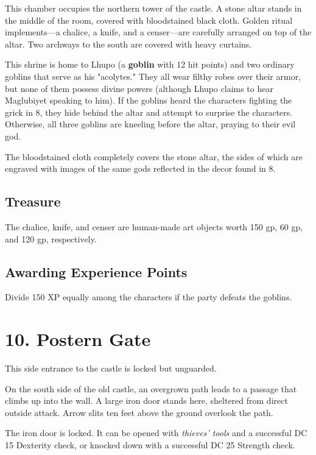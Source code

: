\documentclass[10pt,a4paper,twoside,bg=print,twocolumn,openany,nodeprecatedcode]{dndbook}
\begin{document}
\begin{DndReadAloud}{}
This chamber occupies the northern tower of the castle. A stone altar stands in the middle of the room, covered with bloodstained black cloth. Golden ritual implements—a chalice, a knife, and a censer—are carefully arranged on top of the altar. Two archways to the south are covered with heavy curtains.

\end{DndReadAloud}

This shrine is home to Lhupo (a \textbf{goblin} with 12 hit points) and two ordinary goblins that serve as his "acolytes." They all wear filthy robes over their armor, but none of them possess divine powers (although Lhupo claims to hear Maglubiyet speaking to him). If the goblins heard the characters fighting the grick in 8, they hide behind the altar and attempt to surprise the characters. Otherwise, all three goblins are kneeling before the altar, praying to their evil god.

The bloodstained cloth completely covers the stone altar, the sides of which are engraved with images of the same gods reflected in the decor found in 8.

\subsection{Treasure}
The chalice, knife, and censer are human-made art objects worth 150 gp, 60 gp, and 120 gp, respectively.

\subsection{Awarding Experience Points}
Divide 150 XP equally among the characters if the party defeats the goblins.

\section{10. Postern Gate}
This side entrance to the castle is locked but unguarded.

\begin{DndReadAloud}{}
On the south side of the old castle, an overgrown path leads to a passage that climbs up into the wall. A large iron door stands here, sheltered from direct outside attack. Arrow slits ten feet above the ground overlook the path.

\end{DndReadAloud}

The iron door is locked. It can be opened with \textit{thieves' tools} and a successful DC 15 Dexterity check, or knocked down with a successful DC 25 Strength check.
\end{document}
